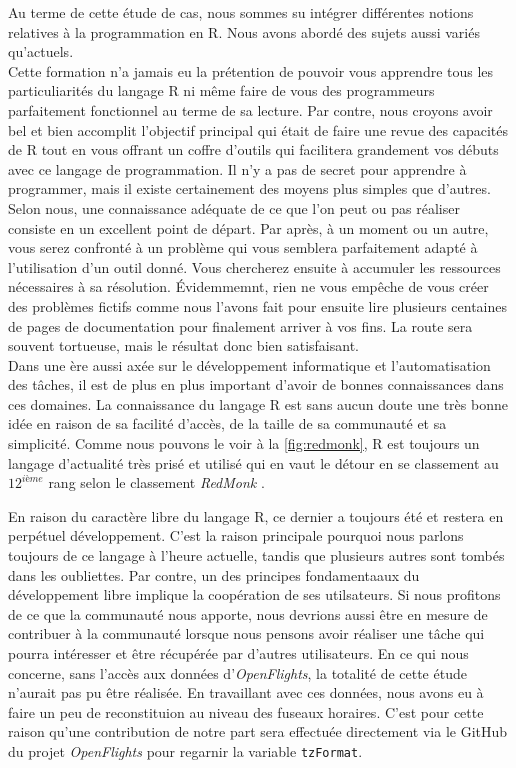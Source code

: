 Au terme de cette étude de cas, nous sommes su intégrer différentes notions relatives à la programmation en R. Nous avons abordé des sujets aussi variés qu'actuels. \\

Cette formation n'a jamais eu la prétention de pouvoir vous apprendre tous les particuliarités du langage R ni même faire de vous des programmeurs parfaitement fonctionnel au terme de sa lecture. Par contre, nous croyons avoir bel et bien accomplit l'objectif principal qui était de faire une revue des capacités de R tout en vous offrant un coffre d'outils qui facilitera grandement vos débuts avec ce langage de programmation. Il n'y a pas de secret pour apprendre à programmer, mais il existe certainement des moyens plus simples que d'autres. Selon nous, une connaissance adéquate de ce que l'on peut ou pas réaliser consiste en un excellent point de départ. Par après, à un moment ou un autre, vous serez confronté à un problème qui vous semblera parfaitement adapté à l'utilisation d'un outil donné. Vous chercherez ensuite à accumuler les ressources nécessaires à sa résolution. Évidemmemnt, rien ne vous empêche de vous créer des problèmes fictifs comme nous l'avons fait pour ensuite lire plusieurs centaines de pages de documentation pour finalement arriver à vos fins. La route sera souvent tortueuse, mais le résultat donc bien satisfaisant. \\

Dans une ère aussi axée sur le développement informatique et l'automatisation des tâches, il est de plus en plus important d'avoir de bonnes connaissances dans ces domaines. La connaissance du langage R est sans aucun doute une très bonne idée en raison de sa facilité d'accès, de la taille de sa communauté et sa simplicité. Comme nous pouvons le voir à la \autoref{fig:redmonk}, R est toujours un langage d'actualité très prisé et utilisé qui en vaut le détour en se classement au $12^{ième}$ rang selon le classement \emph{RedMonk} \cite{codingGame}. \\


En raison du caractère libre du langage R, ce dernier a toujours été et restera en perpétuel développement. C'est la raison principale pourquoi nous parlons toujours de ce langage à l'heure actuelle, tandis que plusieurs autres sont tombés dans les oubliettes. Par contre, un des principes fondamentaaux du développement libre implique la coopération de ses utilsateurs. Si nous profitons de ce que la communauté nous apporte, nous devrions aussi être en mesure de contribuer à la communauté lorsque nous pensons avoir réaliser une tâche qui pourra intéresser et être récupérée par d'autres utilisateurs. En ce qui nous concerne, sans l'accès aux données d'\emph{OpenFlights}, la totalité de cette étude n'aurait pas pu être réalisée. En travaillant avec ces données, nous avons eu à faire un peu de reconstituion au niveau des fuseaux horaires. C'est pour cette raison qu'une contribution de notre part sera effectuée directement via le GitHub du projet \emph{OpenFlights} pour regarnir la variable \texttt{tzFormat}. \\

